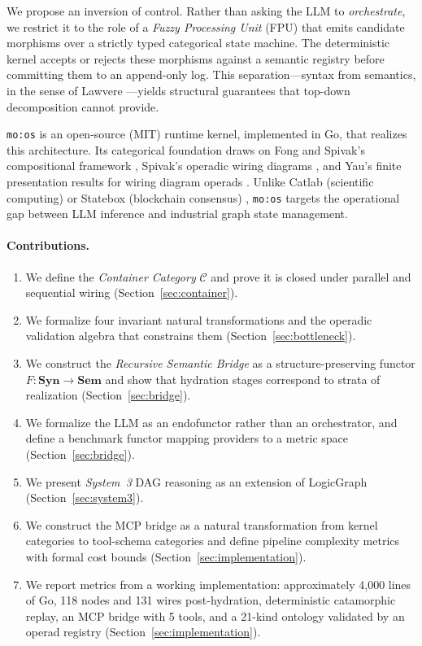 \documentclass[submission,copyright,creativecommons]{eptcs}
\begin{document}
We propose an inversion of control. Rather than asking the LLM to
\emph{orchestrate}, we restrict it to the role of a \emph{Fuzzy Processing
Unit} (FPU) that emits candidate morphisms over a strictly typed categorical
state machine. The deterministic kernel accepts or rejects these morphisms
against a semantic registry before committing them to an append-only log. This
separation---syntax from semantics, in the sense of Lawvere
\cite{lawvere1963}---yields structural guarantees that top-down decomposition
cannot provide.

\texttt{mo:os} is an open-source (MIT) runtime kernel, implemented in Go,
that realizes this architecture. Its categorical foundation draws on Fong and
Spivak's compositional framework \cite{fong2018}, Spivak's operadic wiring
diagrams \cite{spivak2013,spivak2013operad}, and Yau's finite presentation
results for wiring diagram operads \cite{yau2018}. Unlike Catlab (scientific
computing) or Statebox (blockchain consensus) \cite{statebox2019}, \texttt{mo:os}
targets the operational gap between LLM inference and industrial graph
state management.

\paragraph{Contributions.}
\begin{enumerate}
  \item We define the \emph{Container Category} $\mathcal{C}$ and prove it is
        closed under parallel and sequential wiring (Section~\ref{sec:container}).
  \item We formalize four invariant natural transformations and the operadic
        validation algebra that constrains them (Section~\ref{sec:bottleneck}).
  \item We construct the \emph{Recursive Semantic Bridge} as a
        structure-preserving functor $F\colon \mathbf{Syn} \to \mathbf{Sem}$
        and show that hydration stages correspond to strata of realization
        (Section~\ref{sec:bridge}).
  \item We formalize the LLM as an endofunctor rather than an orchestrator,
        and define a benchmark functor mapping providers to a metric space
        (Section~\ref{sec:bridge}).
  \item We present \emph{System~3} DAG reasoning as an extension of
        LogicGraph \cite{logicgraph2025} (Section~\ref{sec:system3}).
  \item We construct the MCP bridge as a natural transformation from kernel
        categories to tool-schema categories and define pipeline complexity
        metrics with formal cost bounds (Section~\ref{sec:implementation}).
  \item We report metrics from a working implementation: approximately 4{,}000
        lines of Go, 118 nodes and 131 wires post-hydration, deterministic
        catamorphic replay, an MCP bridge with 5 tools, and a 21-kind ontology
        validated by an operad registry (Section~\ref{sec:implementation}).
\end{enumerate}
\end{document}
